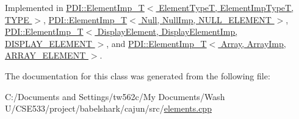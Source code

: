 Implemented in \hyperlink{class_p_d_i_1_1_element_imp___t_23d3df9b834aecb1fa3afba5ebd4ae66}{PDI::ElementImp\_\-T$<$ ElementTypeT, ElementImpTypeT, TYPE $>$}, \hyperlink{class_p_d_i_1_1_element_imp___t_23d3df9b834aecb1fa3afba5ebd4ae66}{PDI::ElementImp\_\-T$<$ Null, NullImp, NULL\_\-ELEMENT $>$}, \hyperlink{class_p_d_i_1_1_element_imp___t_23d3df9b834aecb1fa3afba5ebd4ae66}{PDI::ElementImp\_\-T$<$ DisplayElement, DisplayElementImp, DISPLAY\_\-ELEMENT $>$}, and \hyperlink{class_p_d_i_1_1_element_imp___t_23d3df9b834aecb1fa3afba5ebd4ae66}{PDI::ElementImp\_\-T$<$ Array, ArrayImp, ARRAY\_\-ELEMENT $>$}.

The documentation for this class was generated from the following file:\begin{CompactItemize}
\item 
C:/Documents and Settings/tw562c/My Documents/Wash U/CSE533/project/babelshark/cajun/src/\hyperlink{elements_8cpp}{elements.cpp}\end{CompactItemize}
